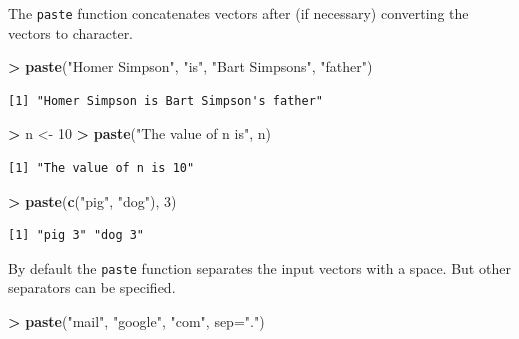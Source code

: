 \documentclass[
]{krantz}
\makeatletter
\newenvironment{Shaded}{\begin{snugshade}}{\end{snugshade}}
\newcommand{\DataTypeTok}[1]{\textcolor[rgb]{0.27,0.27,0.27}{#1}}
\newcommand{\DecValTok}[1]{\textcolor[rgb]{0.06,0.06,0.06}{#1}}
\newcommand{\KeywordTok}[1]{\textcolor[rgb]{0.27,0.27,0.27}{\textbf{#1}}}
\newcommand{\NormalTok}[1]{#1}
\newcommand{\OperatorTok}[1]{\textcolor[rgb]{0.43,0.43,0.43}{\textbf{#1}}}
\newcommand{\StringTok}[1]{\textcolor[rgb]{0.5,0.5,0.5}{#1}}
\newenvironment{kframe}{%
\medskip{}
\setlength{\fboxsep}{.8em}
 \def\at@end@of@kframe{}%
 \ifinner\ifhmode%
  \def\at@end@of@kframe{\end{minipage}}%
  \begin{minipage}{\columnwidth}%
 \fi\fi%
 \def\FrameCommand##1{\hskip\@totalleftmargin \hskip-\fboxsep
 \colorbox{shadecolor}{##1}\hskip-\fboxsep
     \hskip-\linewidth \hskip-\@totalleftmargin \hskip\columnwidth}%
 \MakeFramed {\advance\hsize-\width
   \@totalleftmargin\z@ \linewidth\hsize
   \@setminipage}}%
 {\par\unskip\endMakeFramed%
 \at@end@of@kframe}
\renewenvironment{Shaded}{\begin{kframe}}{\end{kframe}}
\makeatother
\begin{document}
The \texttt{paste} function concatenates vectors after (if necessary) converting the vectors to character.

\begin{Shaded}
\begin{Highlighting}[]
\OperatorTok{\textgreater{}}\StringTok{ }\KeywordTok{paste}\NormalTok{(}\StringTok{"Homer Simpson"}\NormalTok{, }\StringTok{"is"}\NormalTok{, }\StringTok{"Bart Simpson\textquotesingle{}s"}\NormalTok{, }\StringTok{"father"}\NormalTok{)}
\end{Highlighting}
\end{Shaded}

\begin{verbatim}
[1] "Homer Simpson is Bart Simpson's father"
\end{verbatim}

\begin{Shaded}
\begin{Highlighting}[]
\OperatorTok{\textgreater{}}\StringTok{ }\NormalTok{n \textless{}{-}}\StringTok{ }\DecValTok{10}
\OperatorTok{\textgreater{}}\StringTok{ }\KeywordTok{paste}\NormalTok{(}\StringTok{"The value of n is"}\NormalTok{, n)}
\end{Highlighting}
\end{Shaded}

\begin{verbatim}
[1] "The value of n is 10"
\end{verbatim}

\begin{Shaded}
\begin{Highlighting}[]
\OperatorTok{\textgreater{}}\StringTok{ }\KeywordTok{paste}\NormalTok{(}\KeywordTok{c}\NormalTok{(}\StringTok{"pig"}\NormalTok{, }\StringTok{"dog"}\NormalTok{), }\DecValTok{3}\NormalTok{)}
\end{Highlighting}
\end{Shaded}

\begin{verbatim}
[1] "pig 3" "dog 3"
\end{verbatim}

By default the \texttt{paste} function separates the input vectors with a space. But other separators can be specified.

\begin{Shaded}
\begin{Highlighting}[]
\OperatorTok{\textgreater{}}\StringTok{ }\KeywordTok{paste}\NormalTok{(}\StringTok{"mail"}\NormalTok{, }\StringTok{"google"}\NormalTok{, }\StringTok{"com"}\NormalTok{, }\DataTypeTok{sep=}\StringTok{"."}\NormalTok{)}
\end{Highlighting}
\end{Shaded}
\end{document}
